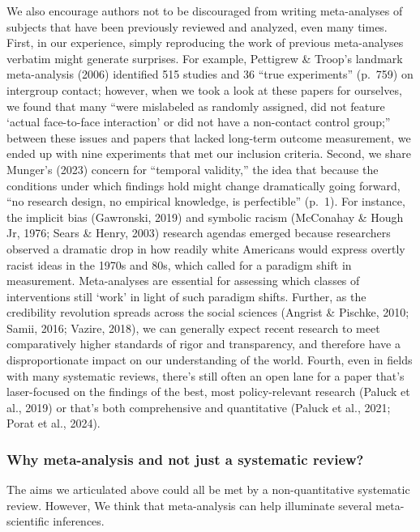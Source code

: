 \documentclass[
  man]{apa6}
\begin{document}
We also encourage authors not to be discouraged from writing meta-analyses of subjects that have been previously reviewed and analyzed, even many times. First, in our experience, simply reproducing the work of previous meta-analyses verbatim might generate surprises. For example, Pettigrew \& Troop's landmark meta-analysis (2006) identified 515 studies and 36 ``true experiments'' (p.~759) on intergroup contact; however, when we took a look at these papers for ourselves, we found that many ``were mislabeled as randomly assigned, did not feature `actual face-to-face interaction' or did not have a non-contact control group;'' between these issues and papers that lacked long-term outcome measurement, we ended up with nine experiments that met our inclusion criteria. Second, we share Munger's (2023) concern for ``temporal validity,'' the idea that because the conditions under which findings hold might change dramatically going forward, ``no research design, no empirical knowledge, is perfectible'' (p.~1). For instance, the implicit bias (Gawronski, 2019) and symbolic racism (McConahay \& Hough Jr, 1976; Sears \& Henry, 2003) research agendas emerged because researchers observed a dramatic drop in how readily white Americans would express overtly racist ideas in the 1970s and 80s, which called for a paradigm shift in measurement. Meta-analyses are essential for assessing which classes of interventions still `work' in light of such paradigm shifts. Further, as the credibility revolution spreads across the social sciences (Angrist \& Pischke, 2010; Samii, 2016; Vazire, 2018), we can generally expect recent research to meet comparatively higher standards of rigor and transparency, and therefore have a disproportionate impact on our understanding of the world. Fourth, even in fields with many systematic reviews, there's still often an open lane for a paper that's laser-focused on the findings of the best, most policy-relevant research (Paluck et al., 2019) or that's both comprehensive and quantitative (Paluck et al., 2021; Porat et al., 2024).

\subsubsection{Why meta-analysis and not just a systematic review?}\label{why-meta-analysis-and-not-just-a-systematic-review}

The aims we articulated above could all be met by a non-quantitative systematic review. However, We think that meta-analysis can help illuminate several meta-scientific inferences.
\end{document}

